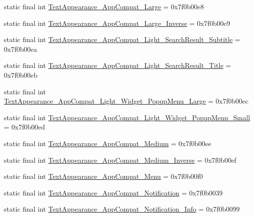 \begin{CompactItemize}
\item 
static final int \hyperlink{classandroid_1_1support_1_1v7_1_1recyclerview_1_1_r_1_1style_8855740ca3fa7a95acaf29d9dea4d13b}{TextAppearance\_\-AppCompat\_\-Large} = 0x7f0b00e8
\item 
static final int \hyperlink{classandroid_1_1support_1_1v7_1_1recyclerview_1_1_r_1_1style_a31a5f90eb015476fb885cb7ce94326a}{TextAppearance\_\-AppCompat\_\-Large\_\-Inverse} = 0x7f0b00e9
\item 
static final int \hyperlink{classandroid_1_1support_1_1v7_1_1recyclerview_1_1_r_1_1style_e665fcd4ff6cbd546e0fbf59189ff2b2}{TextAppearance\_\-AppCompat\_\-Light\_\-SearchResult\_\-Subtitle} = 0x7f0b00ea
\item 
static final int \hyperlink{classandroid_1_1support_1_1v7_1_1recyclerview_1_1_r_1_1style_044b565c14063350d8548c6aa0607fb0}{TextAppearance\_\-AppCompat\_\-Light\_\-SearchResult\_\-Title} = 0x7f0b00eb
\item 
static final int \hyperlink{classandroid_1_1support_1_1v7_1_1recyclerview_1_1_r_1_1style_4f6be793c885883ce4f0d4802cc3b820}{TextAppearance\_\-AppCompat\_\-Light\_\-Widget\_\-PopupMenu\_\-Large} = 0x7f0b00ec
\item 
static final int \hyperlink{classandroid_1_1support_1_1v7_1_1recyclerview_1_1_r_1_1style_33fc3def86fa3b14e6ffceba4d7606ce}{TextAppearance\_\-AppCompat\_\-Light\_\-Widget\_\-PopupMenu\_\-Small} = 0x7f0b00ed
\item 
static final int \hyperlink{classandroid_1_1support_1_1v7_1_1recyclerview_1_1_r_1_1style_ebd7fbcfb1d43f1d09e64a89ad25bc14}{TextAppearance\_\-AppCompat\_\-Medium} = 0x7f0b00ee
\item 
static final int \hyperlink{classandroid_1_1support_1_1v7_1_1recyclerview_1_1_r_1_1style_0e95a1b58e1dc07edbf6a829516b5d68}{TextAppearance\_\-AppCompat\_\-Medium\_\-Inverse} = 0x7f0b00ef
\item 
static final int \hyperlink{classandroid_1_1support_1_1v7_1_1recyclerview_1_1_r_1_1style_f06ea60e46f98b54b49e8ce91f463222}{TextAppearance\_\-AppCompat\_\-Menu} = 0x7f0b00f0
\item 
static final int \hyperlink{classandroid_1_1support_1_1v7_1_1recyclerview_1_1_r_1_1style_f32cc7a6b5b3f25203aabd28999bc7f5}{TextAppearance\_\-AppCompat\_\-Notification} = 0x7f0b0039
\item 
static final int \hyperlink{classandroid_1_1support_1_1v7_1_1recyclerview_1_1_r_1_1style_701be9a79aa6dbc683993df8ef29a79d}{TextAppearance\_\-AppCompat\_\-Notification\_\-Info} = 0x7f0b0099
\item 

\end{CompactItemize}
